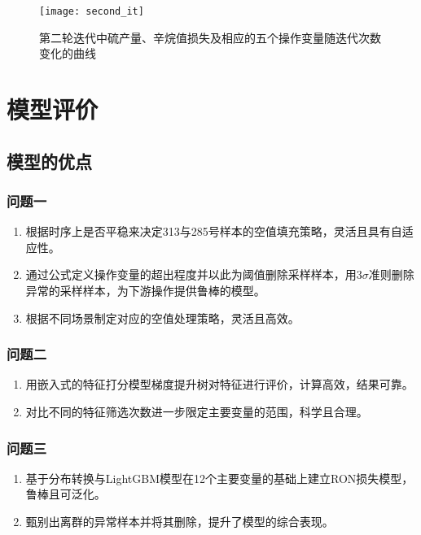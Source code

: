 \documentclass[bwprint]{gmcmthesis}
\begin{document}
\begin{figure}[htb]
	\centering
	\texttt{[image: second\_it]}
	\caption{第二轮迭代中硫产量、辛烷值损失及相应的五个操作变量随迭代次数变化的曲线}
\end{figure}


\FloatBarrier
\section{模型评价}


\FloatBarrier
\subsection{模型的优点}
\FloatBarrier
\subsubsection{问题一}
\begin{enumerate}[itemindent=20pt]
    \item 根据时序上是否平稳来决定313与285号样本的空值填充策略，灵活且具有自适应性。
    \item 通过公式定义操作变量的超出程度并以此为阈值删除采样样本，用3$\sigma$准则删除异常的采样样本，为下游操作提供鲁棒的模型。
    \item 根据不同场景制定对应的空值处理策略，灵活且高效。
\end{enumerate}

\FloatBarrier
\subsubsection{问题二}
\begin{enumerate}[itemindent=20pt]
    \item 用嵌入式的特征打分模型梯度提升树对特征进行评价，计算高效，结果可靠。
    \item 对比不同的特征筛选次数进一步限定主要变量的范围，科学且合理。
\end{enumerate}


\FloatBarrier
\subsubsection{问题三}
\begin{enumerate}[itemindent=20pt]
    \item 基于分布转换与LightGBM模型在12个主要变量的基础上建立RON损失模型，鲁棒且可泛化。
    \item 甄别出离群的异常样本并将其删除，提升了模型的综合表现。
\end{enumerate}
\end{document}
